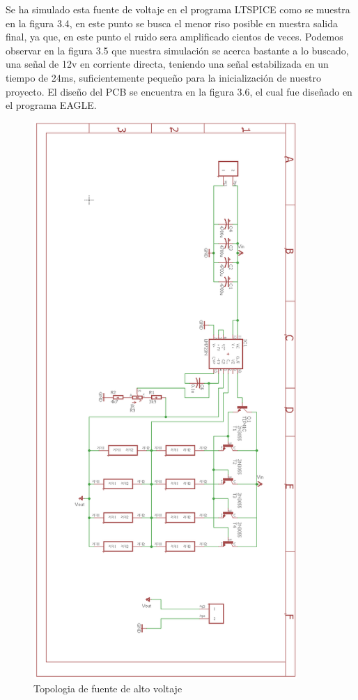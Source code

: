 Se ha simulado esta fuente de voltaje en el programa LTSPICE como se muestra en la figura 3.4, en este punto se busca el menor riso posible en nuestra salida final, ya que, en este punto el ruido sera amplificado cientos de veces. Podemos observar en la figura 3.5 que nuestra simulación se acerca bastante a lo buscado, una señal de 12v en corriente directa, teniendo una señal estabilizada en un tiempo de 24ms, suficientemente pequeño para la inicialización de nuestro proyecto. El diseño del PCB se encuentra en la figura 3.6, el cual fue diseñado en el programa EAGLE.\\
\begin{figure}[H]
\centering
\includegraphics[width=10cm]{Capitulo3/figs/fuente.png}
\caption{Topologia de fuente de alto voltaje}
\end{figure}


